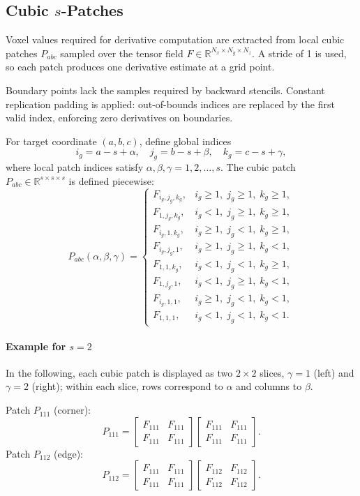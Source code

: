 \documentclass[pdflatex,sn-mathphys-num]{sn-jnl}%
\newcommand{\rev}[1]{\textcolor{red}{#1}}
\theoremstyle{thmstyleone}%
\theoremstyle{thmstyletwo}%
\theoremstyle{thmstylethree}%
\begin{document}
{\subsection{Cubic $s$-Patches}\rev{\label{subsec:cubic}}
Voxel values required for derivative computation are extracted from local cubic patches $P_{abc}$ sampled over the tensor field $F\in\mathbb{R}^{N_x\times N_y\times N_z}$. A stride of 1 is used, so each patch produces one derivative estimate at a grid point.

Boundary points lack the samples required by backward stencils. Constant replication padding is applied: out-of-bounds indices are replaced by the first valid index, enforcing zero derivatives on boundaries.

For target coordinate $(a,b,c)$, define global indices
\[
i_g = a-s+\alpha,\quad j_g = b-s+\beta,\quad k_g = c-s+\gamma,
\]
where local patch indices satisfy $\alpha,\beta,\gamma = 1,2,\dots,s$. The cubic patch $P_{abc}\in\mathbb{R}^{s\times s\times s}$ is defined piecewise:
\begin{equation}
P_{abc}(\alpha,\beta,\gamma)=
\begin{cases}
F_{i_g,j_g,k_g}, & i_g\ge 1,\; j_g\ge 1,\; k_g\ge 1,\\
F_{1,j_g,k_g}, & i_g<1,\; j_g\ge 1,\; k_g\ge 1,\\
F_{i_g,1,k_g}, & i_g\ge 1,\; j_g<1,\; k_g\ge 1,\\
F_{i_g,j_g,1}, & i_g\ge 1,\; j_g\ge 1,\; k_g<1,\\
F_{1,1,k_g}, & i_g<1,\; j_g<1,\; k_g\ge 1,\\
F_{1,j_g,1}, & i_g<1,\; j_g\ge 1,\; k_g<1,\\
F_{i_g,1,1}, & i_g\ge 1,\; j_g<1,\; k_g<1,\\
F_{1,1,1}, & i_g<1,\; j_g<1,\; k_g<1.
\end{cases}
\label{eq:patch_def_3d}
\end{equation}

\paragraph{Example for $s=2$}
In the following, each cubic patch is displayed as two $2\times 2$ slices, $\gamma=1$ (left) and $\gamma=2$ (right); within each slice, rows correspond to $\alpha$ and columns to $\beta$.

Patch $P_{111}$ (corner):
\[
P_{111}=
\begin{bmatrix}
F_{111} & F_{111}\\
F_{111} & F_{111}
\end{bmatrix}
\begin{bmatrix}
F_{111} & F_{111}\\
F_{111} & F_{111}
\end{bmatrix}.
\]
Patch $P_{112}$ (edge):
\[
P_{112}=
\begin{bmatrix}
F_{111} & F_{111}\\
F_{111} & F_{111}
\end{bmatrix}
\begin{bmatrix}
F_{112} & F_{112}\\
F_{112} & F_{112}
\end{bmatrix}.
\]

}
\end{document}
